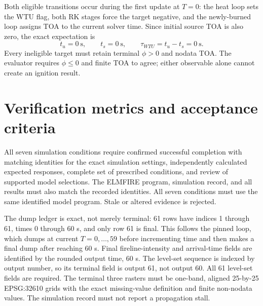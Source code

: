 Both eligible transitions occur during the first update at \(T=0\): the heat
loop sets the WTU flag, both RK stages force the target negative, and the
newly-burned loop assigns TOA to the current solver time.  Since initial source
TOA is also zero, the exact expectation is
\[
 t_u=0\ \mathrm{s},\qquad t_s=0\ \mathrm{s},\qquad
 \tau_{WTU}=t_u-t_s=0\ \mathrm{s}.
\]
Every ineligible target must retain terminal \(\phi>0\) and nodata TOA.  The
evaluator requires \(\phi\le0\) and finite TOA to agree; either observable alone
cannot create an ignition result.

\section{Verification metrics and acceptance criteria}

All seven simulation conditions require confirmed successful completion with
matching identities for the exact simulation settings, independently calculated
expected responses, complete set of prescribed conditions, and review of
supported model selections. The ELMFIRE program, simulation record, and all
results must also match the recorded identities. All seven conditions must use
the same identified model program. Stale or altered evidence is rejected.

The dump ledger is exact, not merely terminal: 61 rows have indices 1 through
61, times 0 through 60 s, and only row 61 is final.  This follows the pinned
loop, which dumps at current \(T=0,\ldots,59\) before incrementing time and then
makes a final dump after reaching 60 s. Final fireline-intensity and arrival-time
fields are identified by the rounded output time, 60 s. The level-set sequence
is indexed by output number, so its terminal field is output 61, not output 60.
All 61 level-set fields are required. The terminal three rasters must be one-band, aligned
25-by-25 EPSG:32610 grids with the exact missing-value definition and finite non-nodata
values. The simulation record must not report a propagation stall.

